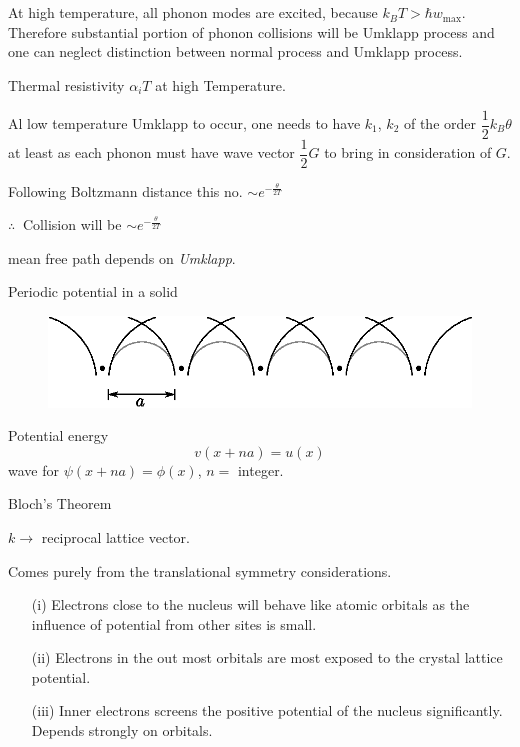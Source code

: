 \chapter[Lecture 21]{}\label{lec21}

At high temperature, all phonon modes are excited, because $k_{B}T>\hbar w_{\max}$. Therefore substantial portion of phonon collisions will be Umklapp process and one can neglect distinction between normal process and Umklapp process.

Thermal resistivity $\alpha_{i}T$ at high Temperature.

Al low temperature Umklapp to occur, one needs to have $k_{1}$, $k_{2}$ of the order $\dfrac{1}{2}k_{B}\theta$ at least as each phonon must have wave vector $\dfrac{1}{2}G$ to bring in consideration of $G$.

Following Boltzmann distance this no. $\sim e^{-\frac{\theta}{2T}}$

$\therefore \ $ Collision will be $\sim e^{-\frac{\theta}{2T}}$

mean free path depends on {\em Umklapp}.

Periodic potential in a solid
\begin{figure}[H]
\centering
\includegraphics{images/lecture21/fig1.eps}
\end{figure}

Potential energy
$$
v(x+na)=u(x)
$$
wave for $\psi(x+na)=\phi(x)$, $n=$ integer.

Bloch's Theorem 

$k\to$ reciprocal lattice vector.

Comes purely from the translational symmetry considerations.
\begin{itemize}
\item[(i)] Electrons close to the nucleus will behave like atomic orbitals as the influence of potential from other sites is small.

\item[(ii)] Electrons in the out most orbitals are most exposed to the crystal lattice potential.

\item[(iii)] Inner electrons screens the positive potential of the nucleus significantly. Depends strongly on orbitals.
\end{itemize}

